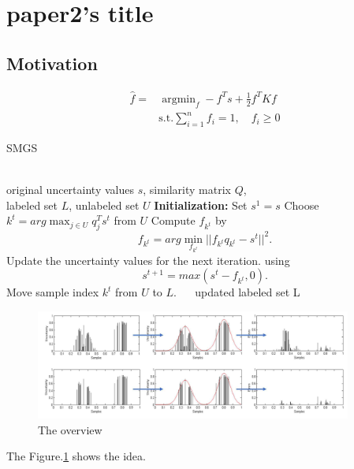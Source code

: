 \renewcommand{\algorithmicrequire}{\textbf{Input:}}
\renewcommand{\algorithmicensure}{\textbf{Output:}} 

\section{paper2's title}

\subsection{Motivation}

\begin{equation}
\begin{aligned} 
    \widehat{f} = & \operatorname{argmin}_{f} - f^{T} s + \frac{1}{2} f^{T} K f \\ 
    &\text{s.t.}\sum_{i=1}^{n}f_{i}=1,\quad f_{i}\geq0
\end{aligned}
\label{equ:max_div}
\end{equation}

\begin{algorithm}
\caption{SMGS}
\label{alg:gs}
\begin{algorithmic}
    \REQUIRE ~~\\
    original uncertainty values $s$, similarity matrix $Q$, \\
    labeled set $L$, unlabeled set $U$
    \STATE \textbf{Initialization:} Set $s^1 = s$
        \STATE Choose $k^t = arg \max_{j\in U} q^T_j s^t$ from $U$
        \STATE Compute $f_{k^t}$ by $$ f_{k^t} = arg \min_{f_{k^t}} ||f_{k^t} q_{k^t} - s^t||^2.$$
        \STATE Update the uncertainty values for the next iteration.
        \STATE using $$s^{t+1} = max(s^t - f_{k^t}, 0).$$
        \STATE Move sample index $k^t$ from $U$ to $L$.
    \ENDFOR
    \ENSURE ~~ updated labeled set L
\end{algorithmic}
    \label{code:SMGS}
\end{algorithm}



\begin{figure}[ht!]
    \centering
    \includegraphics[width=10.4cm]{sparse_selective.png}
    \caption{The overview}
    \label{sparse_time}
\end{figure}

The Figure.\ref{sparse_time} shows the idea.